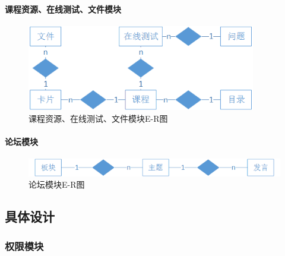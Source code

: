 \documentclass[titlepage,UTF8,linespread=1.5]{ctexart}
\begin{document}
\paragraph{课程资源、在线测试、文件模块}
\begin{figure}[H]
    \centering
    \includegraphics[width=100mm]{er-course-exam-file.png}
    \caption{课程资源、在线测试、文件模块E-R图}
    \label{fig:er-course-exam-file}
\end{figure}
\paragraph{论坛模块}
\begin{figure}[H]
    \centering
    \includegraphics[width=140mm]{er-forum.png}
    \caption{论坛模块E-R图}
    \label{fig:er-forum}
\end{figure}

\subsection{具体设计}
\subsubsection{权限模块}
\end{document}
